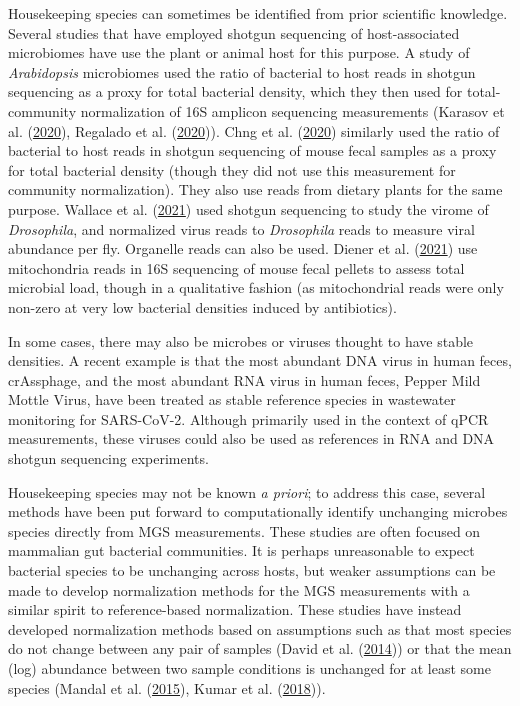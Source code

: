 \documentclass[
]{article}
\begin{document}
Housekeeping species can sometimes be identified from prior scientific knowledge.
Several studies that have employed shotgun sequencing of host-associated microbiomes have use the plant or animal host for this purpose.
A study of \emph{Arabidopsis} microbiomes used the ratio of bacterial to host reads in shotgun sequencing as a proxy for total bacterial density, which they then used for total-community normalization of 16S amplicon sequencing measurements (Karasov et al. (\protect\hyperlink{ref-karasov2020ther}{2020}), Regalado et al. (\protect\hyperlink{ref-regalado2019comb}{2020})).
Chng et al. (\protect\hyperlink{ref-chng2020meta}{2020}) similarly used the ratio of bacterial to host reads in shotgun sequencing of mouse fecal samples as a proxy for total bacterial density (though they did not use this measurement for community normalization).
They also use reads from dietary plants for the same purpose.
Wallace et al. (\protect\hyperlink{ref-wallace2021thed}{2021}) used shotgun sequencing to study the virome of \emph{Drosophila}, and normalized virus reads to \emph{Drosophila} reads to measure viral abundance per fly.
Organelle reads can also be used.
Diener et al. (\protect\hyperlink{ref-diener2021nonr}{2021}) use mitochondria reads in 16S sequencing of mouse fecal pellets to assess total microbial load, though in a qualitative fashion (as mitochondrial reads were only non-zero at very low bacterial densities induced by antibiotics).

In some cases, there may also be microbes or viruses thought to have stable densities.
A recent example is that the most abundant DNA virus in human feces, crAssphage, and the most abundant RNA virus in human feces, Pepper Mild Mottle Virus, have been treated as stable reference species in wastewater monitoring for SARS-CoV-2.
Although primarily used in the context of qPCR measurements, these viruses could also be used as references in RNA and DNA shotgun sequencing experiments.

Housekeeping species may not be known \emph{a priori}; to address this case, several methods have been put forward to computationally identify unchanging microbes species directly from MGS measurements.
These studies are often focused on mammalian gut bacterial communities.
It is perhaps unreasonable to expect bacterial species to be unchanging across hosts, but weaker assumptions can be made to develop normalization methods for the MGS measurements with a similar spirit to reference-based normalization.
These studies have instead developed normalization methods based on assumptions such as that most species do not change between any pair of samples (David et al. (\protect\hyperlink{ref-david2014host}{2014})) or that the mean (log) abundance between two sample conditions is unchanged for at least some species (Mandal et al. (\protect\hyperlink{ref-mandal2015anal}{2015}), Kumar et al. (\protect\hyperlink{ref-kumar2018anal}{2018})).
\end{document}
